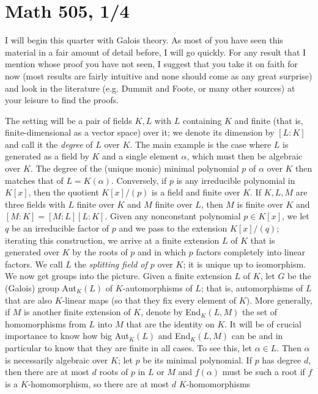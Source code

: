 \documentclass[10pt]{article}
\begin{document}
\section*{Math 505, 1/4}

I will begin this quarter with Galois theory. As most of you have seen
this material in a fair amount of detail before, I will go quickly. For
any result that I mention whose proof you have not seen, I suggest that
you take it on faith for now (most results are fairly intuitive and none
should come as any great surprise) and look in the literature (e.g.
Dummit and Foote, or many other sources) at your leisure to find the
proofs.

The setting will be a pair of fields $K,L$ with $L$ containing $K$ and
finite (that is, finite-dimensional as a vector space) over it; we
denote its dimension by $[L:K]$ and call it the {\sl degree} of $L$ over
$K$. The main example is the case where $L$ is generated as a field by
$K$ and a single element $\alpha$, which must then be algebraic over
$K$. The degree of the (unique monic) minimal polynomial $p$ of $\alpha$
over $K$ then matches that of $L=K(\alpha)$. Conversely, if $p$ is any
irreducible polynomial in $K[x]$, then the quotient $K[x]/(p)$ is a
field and finite over $K$. If $K,L,M$ are three fields with $L$ finite
over $K$ and $M$ finite over $L$, then $M$ is finite over $K$ and
$[M:K]=[M:L][L:K]$. Given any nonconstant polynomial $p\in K[x]$, we let
$q$ be an irreducible factor of $p$ and we pass to the extension
$K[x]/(q)$; iterating this construction, we arrive at a finite extension
$L$ of $K$ that is generated over $K$ by the roots of $p$ and in which
$p$ factors completely into linear factors. We call $L$ the {\sl
  splitting field of $p$} over $K$; it is unique up to isomorphism. We
now get groups into the picture. Given a finite extension $L$ of $K$,
let $G$ be the (Galois) group Aut$_K(L)$ of $K$-automorphisms of $L$;
that is, automorphisms of $L$ that are also $K$-linear maps (so that
they fix every element of $K$). More generally, if $M$ is another finite
extension of $K$, denote by End$_K(L,M)$ the set of homomorphisms from
$L$ into $M$ that are the identity on $K$. It will be of crucial
importance to know how big Aut$_K(L)$ and End$_K(L,M)$ can be and in
particular to know that they are finite in all cases. To see this, let
$\alpha\in L$. Then $\alpha$ is necessarily algebraic over $K$; let $p$
be its minimal polynomial. If $p$ has degree $d$, then there are at most
$d$ roots of $p$ in $L$ or $M$ and $f(\alpha)$ must be such a root if
$f$ is a $K$-homomorphism, so there are at most $d$ $K$-homomorphisms
\end{document}
